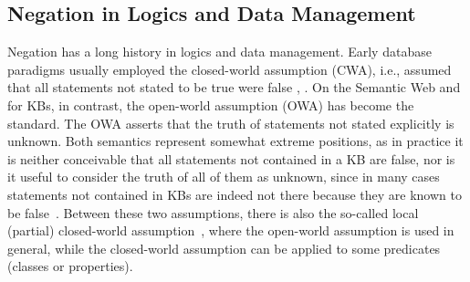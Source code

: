 





\subsection{Negation in Logics and Data Management}


Negation has a long history in logics and data management. Early database paradigms usually employed the closed-world assumption (CWA), i.e., assumed that all statements not stated to be true were false \cite{Reiter78}, \cite{ICWA}. On the Semantic Web and for KBs, in contrast, the open-world assumption (OWA) has become the standard. The OWA asserts that the truth of statements not stated explicitly is unknown. Both semantics represent somewhat extreme positions, as in practice it is neither conceivable that all statements not contained in a KB are false, nor is it useful to consider the truth of all of them as unknown, since in many cases statements not contained in KBs are indeed not there because they are known to be false~\cite{razniewskilimits}. Between these two assumptions, there is also the so-called local (partial) closed-world assumption~\cite{RPZ2010c}, where the open-world assumption is used in general, while the  closed-world assumption can be applied to some predicates (classes or properties).

